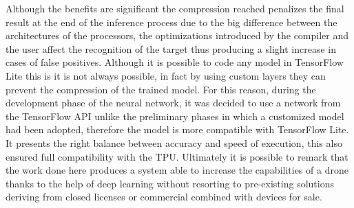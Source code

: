 Although the benefits are significant the compression  reached penalizes the
final result at the end of the inference process due to the big difference
between the architectures of the processors, the optimizations introduced by the
compiler and the user affect the recognition of the target thus producing a
slight increase in cases of false positives. 
Although it is possible to code any model in TensorFlow Lite this is it is not
always possible, in fact by using custom layers they can prevent the compression
of the trained model. For this reason, during the development phase of the
neural network, it was decided to use a network from the TensorFlow API unlike
the preliminary phases in which a customized model had been adopted, therefore
the model is more compatible with TensorFlow Lite. 
It presents the right balance between accuracy and speed of execution, this also
ensured full compatibility with the TPU. Ultimately it is possible to remark
that the work done here produces a system able to increase the capabilities of a
drone thanks to the help of deep learning without resorting to pre-existing
solutions deriving from closed licenses or commercial combined with devices for
sale.